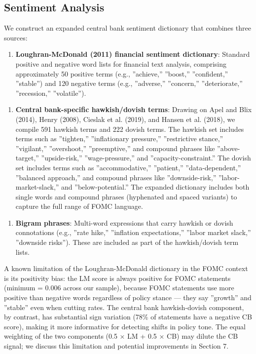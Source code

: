 \documentclass[12pt]{article}
\begin{document}
\subsection{Sentiment Analysis}

We construct an expanded central bank sentiment dictionary that combines three sources:

\begin{enumerate}
\item \textbf{Loughran-McDonald (2011) financial sentiment dictionary}: Standard positive and negative word lists for financial text analysis, comprising approximately 50 positive terms (e.g., ''achieve,'' ''boost,'' ''confident,'' ''stable'') and 120 negative terms (e.g., ''adverse,'' ''concern,'' ''deteriorate,'' ''recession,'' ''volatile'').
\end{enumerate}

\begin{enumerate}
\item \textbf{Central bank-specific hawkish/dovish terms}: Drawing on Apel and Blix (2014), Henry (2008), Cieslak et al. (2019), and Hansen et al. (2018), we compile 591 hawkish terms and 222 dovish terms. The hawkish set includes terms such as ''tighten,'' ''inflationary pressure,'' ''restrictive stance,'' ''vigilant,'' ''overshoot,'' ''preemptive,'' and compound phrases like ''above-target,'' ''upside-risk,'' ''wage-pressure,'' and ''capacity-constraint.'' The dovish set includes terms such as ''accommodative,'' ''patient,'' ''data-dependent,'' ''balanced approach,'' and compound phrases like ''downside-risk,'' ''labor-market-slack,'' and ''below-potential.'' The expanded dictionary includes both single words and compound phrases (hyphenated and spaced variants) to capture the full range of FOMC language.
\end{enumerate}

\begin{enumerate}
\item \textbf{Bigram phrases}: Multi-word expressions that carry hawkish or dovish connotations (e.g., ''rate hike,'' ''inflation expectations,'' ''labor market slack,'' ''downside risks''). These are included as part of the hawkish/dovish term lists.
\end{enumerate}

A known limitation of the Loughran-McDonald dictionary in the FOMC context is its positivity bias: the LM score is always positive for FOMC statements (minimum = 0.006 across our sample), because FOMC statements use more positive than negative words regardless of policy stance --- they say ''growth'' and ''stable'' even when cutting rates. The central bank hawkish-dovish component, by contrast, has substantial sign variation (78\% of statements have a negative CB score), making it more informative for detecting shifts in policy tone. The equal weighting of the two components (0.5 × LM + 0.5 × CB) may dilute the CB signal; we discuss this limitation and potential improvements in Section 7.
\end{document}
